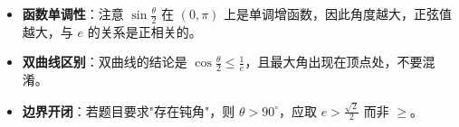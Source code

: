 \begin{trapbox}
\begin{itemize}
    \item \textbf{函数单调性}：注意 $\sin \frac{\theta}{2}$ 在 $(0, \pi)$ 上是单调增函数，因此角度越大，正弦值越大，与 $e$ 的关系是正相关的。
    \item \textbf{双曲线区别}：双曲线的结论是 $\cos \frac{\theta}{2} \le \frac{1}{e}$，且最大角出现在顶点处，不要混淆。
    \item \textbf{边界开闭}：若题目要求"存在钝角"，则 $\theta > 90^\circ$，应取 $e > \frac{\sqrt{2}}{2}$ 而非 $\ge$。
\end{itemize}
\end{trapbox}
